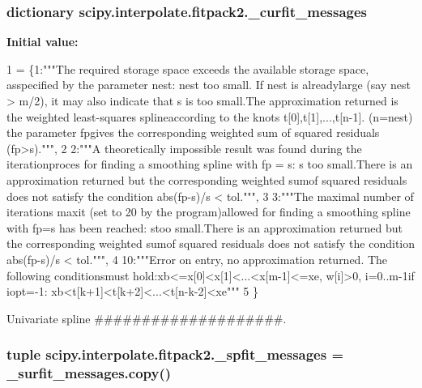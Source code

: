\subsubsection[{\+\_\+curfit\+\_\+messages}]{\setlength{\rightskip}{0pt plus 5cm}dictionary scipy.\+interpolate.\+fitpack2.\+\_\+curfit\+\_\+messages}\label{namespacescipy_1_1interpolate_1_1fitpack2_aab995026c3e8606b3c472a654ae21960}
{\bfseries Initial value\+:}
\begin{DoxyCode}
1 = \{1:\textcolor{stringliteral}{"""The required storage space exceeds the available storage space, asspecified by the parameter nest:
       nest too small. If nest is alreadylarge (say nest > m/2), it may also indicate that s is too small.The
       approximation returned is the weighted least-squares splineaccording to the knots t[0],t[1],...,t[n-1]. (n=nest)
       the parameter fpgives the corresponding weighted sum of squared residuals (fp>s)."""},
2                     2:\textcolor{stringliteral}{"""A theoretically impossible result was found during the iterationproces for finding
       a smoothing spline with fp = s: s too small.There is an approximation returned but the corresponding
       weighted sumof squared residuals does not satisfy the condition abs(fp-s)/s < tol."""},
3                     3:\textcolor{stringliteral}{"""The maximal number of iterations maxit (set to 20 by the program)allowed for
       finding a smoothing spline with fp=s has been reached: stoo small.There is an approximation returned but the
       corresponding weighted sumof squared residuals does not satisfy the condition abs(fp-s)/s < tol."""},
4                     10:\textcolor{stringliteral}{"""Error on entry, no approximation returned. The following conditionsmust
       hold:xb<=x[0]<x[1]<...<x[m-1]<=xe, w[i]>0, i=0..m-1if iopt=-1:  xb<t[k+1]<t[k+2]<...<t[n-k-2]<xe"""}
5                     \}
\end{DoxyCode}


Univariate spline \#\#\#\#\#\#\#\#\#\#\#\#\#\#\#\#\#\#\#\#. 

\hypertarget{namespacescipy_1_1interpolate_1_1fitpack2_a124201a8b539a967417ab60fbd2a0822}{}
\subsubsection[{\+\_\+spfit\+\_\+messages}]{\setlength{\rightskip}{0pt plus 5cm}tuple scipy.\+interpolate.\+fitpack2.\+\_\+spfit\+\_\+messages = \+\_\+surfit\+\_\+messages.\+copy()}\label{namespacescipy_1_1interpolate_1_1fitpack2_a124201a8b539a967417ab60fbd2a0822}
\hypertarget{namespacescipy_1_1interpolate_1_1fitpack2_a7b9b6ca290bc4a32d87bcbedf98701c6}{}
